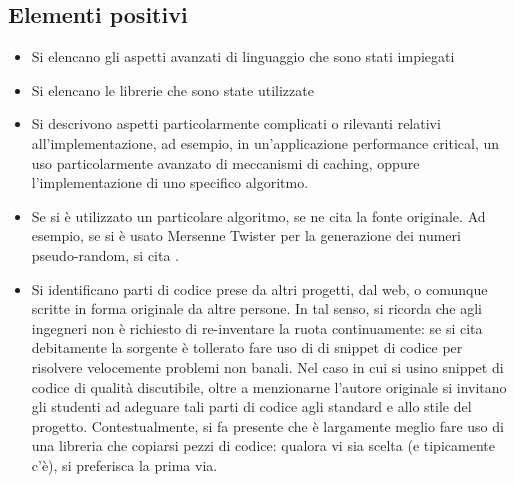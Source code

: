\documentclass[a4paper,12pt]{report}
\begin{document}
\subsection*{Elementi positivi}

\begin{itemize}
	\item Si elencano gli aspetti avanzati di linguaggio che sono stati impiegati
	\item Si elencano le librerie che sono state utilizzate
	\item Si descrivono aspetti particolarmente complicati o rilevanti relativi all'implementazione,
ad esempio, in un'applicazione performance critical, un uso particolarmente avanzato di meccanismi
di caching, oppure l'implementazione di uno specifico algoritmo.
	\item Se si è utilizzato un particolare algoritmo, se ne cita la fonte originale. Ad esempio, se
si è usato Mersenne Twister per la generazione dei numeri pseudo-random, si cita \cite{mersenne}.
	\item Si identificano parti di codice prese da altri progetti, dal web, o comunque scritte in forma originale da altre persone. In tal senso, si ricorda che agli ingegneri non è richiesto di re-inventare la ruota continuamente: se si cita debitamente la sorgente è tollerato fare uso di di snippet di codice per risolvere velocemente problemi non banali. Nel caso in cui si usino snippet di codice di qualità discutibile, oltre a menzionarne l'autore originale si invitano gli studenti ad adeguare tali parti di codice agli standard e allo stile del progetto. Contestualmente, si fa presente che è largamente meglio fare uso di una libreria che copiarsi pezzi di codice: qualora vi sia scelta (e tipicamente c'è), si preferisca la prima via.
\end{itemize}
\end{document}
